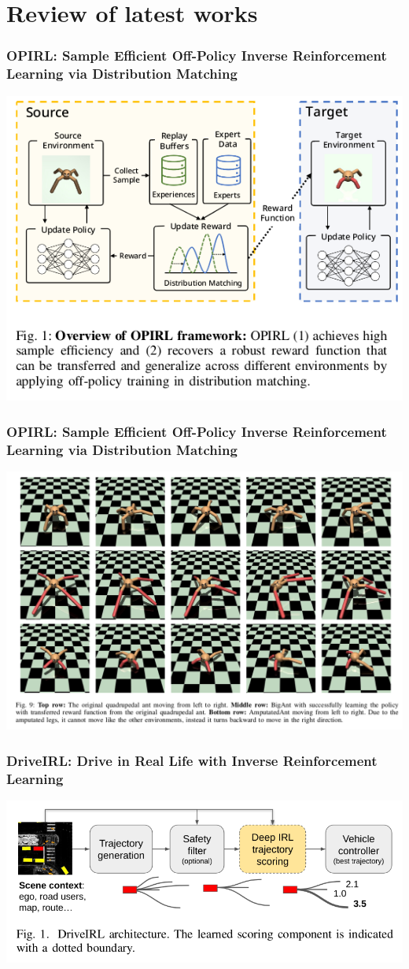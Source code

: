 \section{Review of latest works}

\begin{frame}
    \frametitle{OPIRL: Sample Efficient Off-Policy Inverse Reinforcement Learning via Distribution Matching \cite{hoshino_opirl_2022}}

    \begin{center}
        \includegraphics[width=0.4\linewidth]{content/images/oripl/im1.png}
    \end{center}
\end{frame}

\begin{frame}
    \frametitle{OPIRL: Sample Efficient Off-Policy Inverse Reinforcement Learning via Distribution Matching \cite{hoshino_opirl_2022}}

    \begin{center}
        \includegraphics[width=0.55\linewidth]{content/images/oripl/im2.png}
    \end{center}
\end{frame}

\begin{frame}
    \frametitle{{DriveIRL}: {Drive} in {Real} {Life} with {Inverse} {Reinforcement} {Learning} \cite{phan-minh_driveirl_2023}}

    \begin{center}
        \includegraphics[width=0.55\linewidth]{content/images/driveirl.png}
    \end{center}
\end{frame}

